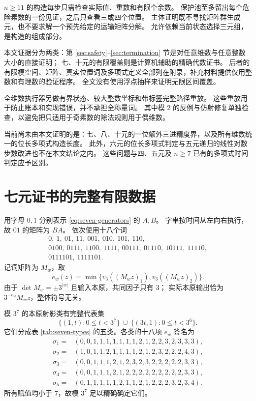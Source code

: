 \documentclass[UTF8,fontset=fandol,zihao=-4,a4paper]{ctexart}
\numberwithin{equation}{section}
\theoremstyle{definition}
\begin{document}
$n\ge11$ 的构造每步只需检查实际值、重数和有限个余数。
保护池至多留出每个危险素数的一份见证，之后只查看三或四个位置。
主体证明既不寻找矩阵群生成元，也不要求解一个预先给定的运输矩阵分解。
允许依赖当前状态选择三元组，是构造的组成部分。

本文证据分为两类：第 \ref{sec:safety}--\ref{sec:termination} 节是对任意维数与任意整数大小的直接证明；
七、十元的有限覆盖则是计算机辅助的精确代数证书。
后者的有限模空间、矩阵、真实位置词及多项式定义全部列在附录，补充材料提供仅用整数和有理数的验证程序。
全文没有使用浮点抽样来证明无限区间覆盖。

全维数执行器另做有界状态、较大整数坐标和带标签完整路径重放。
这些重放用于防止账本和实现错误，并不承担全称量词。
其中模 $2$ 的反例与仿射修复单独检查，以避免把只适用于奇素数的除法规则用于偶维数。

当前尚未由本文证明的是：七、八、十元的一位额外三进精度界，以及所有维数统一的位长多项式构造长度。
此外，六元的位长多项式判定与五元递归的线性对数步数改进也不在本文结论之内。
这些问题与四、五元及 $n\ge7$ 已有的多项式时间判定应予区别。

\appendix
\section{七元证书的完整有限数据}\label{app:seven}

用字母 $0,1$ 分别表示 \eqref{eq:seven-generators} 的 $A,B$。
字串按时间从左向右执行，故 $01$ 的矩阵为 $BA$。
依次使用十八个词
\begin{equation}\label{eq:seven-words}
\begin{gathered}
0,\ 1,\ 01,\ 11,\ 001,\ 010,\ 101,\ 110,\\
0100,\ 0111,\ 1100,\ 1111,\ 00111,\ 01110,\ 10111,\ 11110,\\
0111101,\ 1111101.
\end{gathered}
\end{equation}
记词矩阵为 $M_w$，取
\[
 e_w(z)=\min\{v_3((M_wz)_1),v_3((M_wz)_2)\}.
\]
由于 $\det M_w=\pm3^{|w|}$ 且输入本原，共同因子只有 $3$；
实际本原输出恰为 $3^{-e_w}M_wz$，整体符号无关。

模 $3^7$ 的本原射影类有完整代表集
\[
 \{(1,t):0\le t<3^7\}\ \cup\
 \{(3t,1):0\le t<3^6\}.
\]
它们分成表 \ref{tab:seven-types} 的五类。各类的十八项 $e_w$ 签名为
\begin{align*}
\sigma_1={}&(0,0,1,1,1,1,1,1,1,2,1,2,2,3,2,3,3,3),\\
\sigma_2={}&(1,0,1,1,2,1,1,1,1,2,1,2,3,2,2,2,4,3),\\
\sigma_3={}&(0,0,1,1,1,2,1,2,3,2,3,2,2,2,2,2,3,3),\\
\sigma_4={}&(0,0,1,1,1,2,1,2,2,2,2,2,2,2,2,2,3,3),\\
\sigma_5={}&(0,1,1,1,1,1,2,1,1,2,1,2,2,2,3,2,3,4).
\end{align*}
所有赋值均小于 $7$，故模 $3^7$ 足以精确确定它们。
\end{document}
